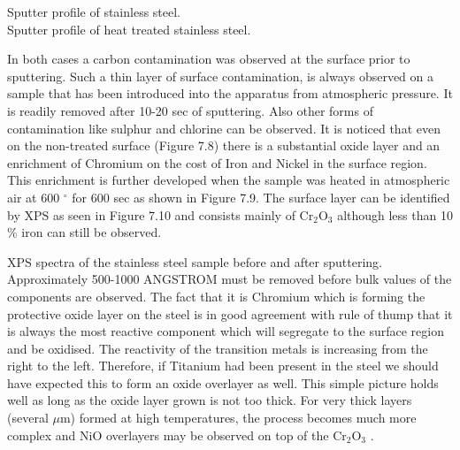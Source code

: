  \newpage

  Sputter profile of stainless steel.\\

 \vspace{11cm}
  Sputter profile of heat treated
 stainless steel.
 \newpage




 In both cases a carbon
 contamination was observed at the surface prior to
 sputtering. Such a thin layer of surface contamination,
 is always observed on a sample that has been introduced into
 the apparatus from atmospheric pressure. It is readily
 removed after 10-20 sec of sputtering. Also other forms of
 contamination like sulphur and chlorine can be observed. It
 is noticed that even on the non-treated surface (Figure 7.8)
 there is a substantial oxide layer and an enrichment of
 Chromium on the cost of Iron and Nickel in the surface
 region. This enrichment is further developed when the sample
 was heated in atmospheric air at 600 $^{\circ}$ for 600 sec
 as shown in Figure 7.9. The surface layer can be identified
 by XPS as seen in Figure 7.10 and consists mainly of
 Cr$_{2}$O$_{3}$ although less than 10 \% iron can still be
 observed.

 \vspace{11cm}

  XPS spectra of the stainless
 steel sample before and after sputtering.\\



 Approximately 500-1000 ANGSTROM must be removed before
 bulk values of the components are observed. The fact that it
 is Chromium which is forming the protective oxide layer on
 the steel is in good agreement with rule of thump that it is
 always the most reactive component which will segregate to
 the surface region and be oxidised. The reactivity of the
 transition metals is increasing from the right to the left.
 Therefore, if Titanium had been present in the steel we should
 have expected this to form an oxide overlayer as well. This
 simple picture holds well as long as the oxide layer grown
 is not too thick. For very thick layers (several $\mu$m)
 formed at high temperatures, the process becomes much more
 complex and NiO overlayers may be observed on top of the
 Cr$_{2}$O$_{3}$ \cite{alstrup}.




